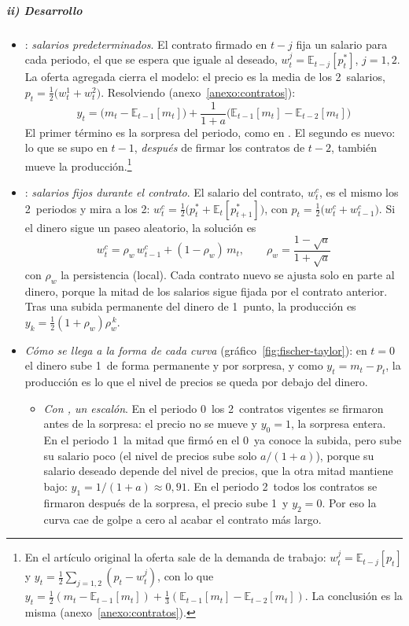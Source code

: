 \documentclass[11pt]{article}
\begin{document}
\subparagraph{ii) Desarrollo}
\begin{itemize}
\item {}: \emph{salarios predeterminados}. El contrato firmado en $t-j$ fija un salario para cada periodo, el que se espera que iguale al deseado, $w^j_t=\mathbb{E}_{t-j}[p^*_t]$, $j=1,2$. La oferta agregada cierra el modelo: el precio es la media de los 2~salarios, $p_t=\tfrac12\big(w^1_t+w^2_t\big)$. Resolviendo (anexo~\ref{anexo:contratos}):
  \begin{equation}
  y_t=\big(m_t-\mathbb{E}_{t-1}[m_t]\big)+\frac{1}{1+a}\big(\mathbb{E}_{t-1}[m_t]-\mathbb{E}_{t-2}[m_t]\big) \label{eq:fischer}
  \end{equation}
  El primer término es la sorpresa del periodo, como en . El segundo es nuevo: lo que se supo en $t-1$, \emph{después} de firmar los contratos de $t-2$, también mueve la producción\nocite{Fischer1977Long}.\footnote{En el artículo original la oferta sale de la demanda de trabajo: $w^j_t=\mathbb{E}_{t-j}[p_t]$ y $y_t=\tfrac12\sum_{j=1,2}(p_t-w^j_t)$, con lo que $y_t=\tfrac12(m_t-\mathbb{E}_{t-1}[m_t])+\tfrac13(\mathbb{E}_{t-1}[m_t]-\mathbb{E}_{t-2}[m_t])$. La conclusión es la misma (anexo~\ref{anexo:contratos}).}
\item {}: \emph{salarios fijos durante el contrato}. El salario del contrato, $w^c_t$, es el mismo los 2~periodos y mira a los 2: $w^c_t=\tfrac12\big(p^*_t+\mathbb{E}_t[p^*_{t+1}]\big)$, con $p_t=\tfrac12\big(w^c_t+w^c_{t-1}\big)$. Si el dinero sigue un paseo aleatorio, la solución es\nocite{Taylor1980Aggregate}
  \begin{equation}
  w^c_t=\rho_w\,w^c_{t-1}+(1-\rho_w)\,m_t,\qquad \rho_w=\frac{1-\sqrt{a}}{1+\sqrt{a}} \label{eq:taylor-contratos}
  \end{equation}
  con $\rho_w$ la persistencia (local). Cada contrato nuevo se ajusta solo en parte al dinero, porque la mitad de los salarios sigue fijada por el contrato anterior. Tras una subida permanente del dinero de 1~punto, la producción es $y_k=\tfrac12(1+\rho_w)\rho_w^{\,k}$.
\item \emph{Cómo se llega a la forma de cada curva} (gráfico~\ref{fig:fischer-taylor}): en $t=0$ el dinero sube 1~de forma permanente y por sorpresa, y como $y_t=m_t-p_t$, la producción es lo que el nivel de precios se queda por debajo del dinero.
  \begin{itemize}
  \item \emph{Con , un escalón}. En el periodo 0~los 2~contratos vigentes se firmaron antes de la sorpresa: el precio no se mueve y $y_0=1$, la sorpresa entera. En el periodo 1~la mitad que firmó en el 0~ya conoce la subida, pero sube su salario poco (el nivel de precios sube solo $a/(1+a)$), porque su salario deseado depende del nivel de precios, que la otra mitad mantiene bajo: $y_1=1/(1+a)\approx0{,}91$. En el periodo 2~todos los contratos se firmaron después de la sorpresa, el precio sube 1~y $y_2=0$. Por eso la curva cae de golpe a cero al acabar el contrato más largo.

\end{itemize}
\end{itemize}
\end{document}
